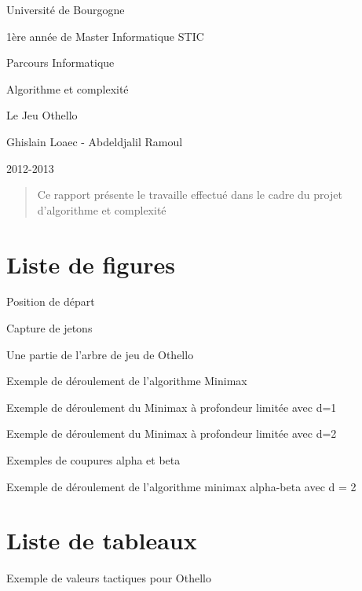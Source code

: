 \documentclass[11pt]{article}
\newenvironment{tmparsep}[1]{\begingroup\setlength{\parskip}{#1}}{\endgroup}
\begin{document}
\begin{center}
  \begin{tmparsep}{0.25em}
    Université de Bourgogne
    
    1ère année de Master Informatique STIC
    
    Parcours Informatique
    
    Algorithme et complexité
  \end{tmparsep}
  
  Le Jeu Othello
  
  Ghislain Loaec - Abdeldjalil Ramoul
  
  2012-2013
\end{center}

\begin{abstract}
  Ce rapport présente le travaille effectué dans le cadre du projet
  d'algorithme et complexité 
\end{abstract}



{\tableofcontents}

\section*{Liste de figures}

\begin{tmparsep}{0em}
  {\small Position de départ ~\pageref{auto-4}
  
  Capture de jetons ~\pageref{auto-5}
  
  Une partie de l'arbre de jeu de Othello ~\pageref{auto-9}
  
  Exemple de déroulement de l'algorithme Minimax ~\pageref{auto-12}
  
  Exemple de déroulement du Minimax à profondeur limitée avec d=1
  ~\pageref{auto-15}
  
  Exemple de déroulement du Minimax à profondeur limitée avec d=2
  ~\pageref{auto-16}
  
  Exemples de coupures alpha et beta ~\pageref{auto-18}
  
  Exemple de déroulement de l'algorithme minimax alpha-beta avec d = 2
  ~\pageref{auto-19}}
\end{tmparsep}

\section*{Liste de tableaux}

\begin{tmparsep}{0em}
  {\small Exemple de valeurs tactiques pour Othello ~\pageref{auto-10}}
\end{tmparsep}
\end{document}
